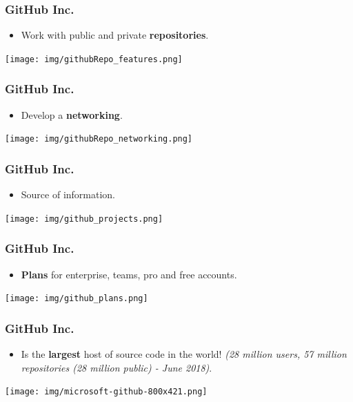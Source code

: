 \documentclass[svgnames]{beamer}
\begin{document}
\begin{frame}
\frametitle{GitHub Inc.}
  \begin{itemize}
  \item Work with public and private \textbf{repositories}. 
  \end{itemize}

\begin{center}
\texttt{[image: img/githubRepo\_features.png]}
\end{center}  

\end{frame}


\begin{frame}
\frametitle{GitHub Inc.}
\begin{itemize}
  \item Develop a \textbf{networking}.
\end{itemize}

\begin{center}
\texttt{[image: img/githubRepo\_networking.png]}
\end{center}  

\end{frame}

\begin{frame}
\frametitle{GitHub Inc.}
\begin{itemize}
  \item Source of information.
\end{itemize}
\begin{center}
\texttt{[image: img/github\_projects.png]}
\end{center}  

\end{frame}

\begin{frame}
    \frametitle{GitHub Inc.}
    \begin{itemize}
        \item \textbf{Plans} for enterprise, teams, pro and free accounts. \hfill \break
    \end{itemize}

\begin{center}
\texttt{[image: img/github\_plans.png]}
\end{center}  


\end{frame}


\begin{frame}
\frametitle{GitHub Inc.}
\begin{itemize}
\item Is the \textbf{largest} host of source code in the world! \emph{(28 million users, 57 million repositories (28 million public) - June 2018)}.
\end{itemize}

\begin{center}
\texttt{[image: img/microsoft-github-800x421.png]}
\end{center}  

\end{frame}
\end{document}
